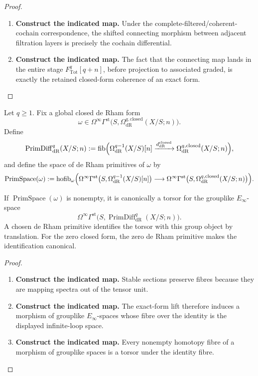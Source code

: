 \begin{proof}
\leavevmode
\begin{enumerate}[label=\textup{(\arabic*)}]
    \item \textbf{Construct the indicated map.}
    Under the complete-filtered/coherent-cochain correspondence, the shifted connecting
    morphism between adjacent filtration layers is precisely the cochain differential.
    \item \textbf{Construct the indicated map.}
    The fact that the connecting map lands in the entire stage
    \(F^q_{\mathrm{Tot}}[q+n]\), before projection to associated graded, is exactly the
    retained closed-form coherence of an exact form.
\end{enumerate}
\end{proof}

\begin{definition}
Let \(q\geq1\). Fix a global closed de Rham form
\[
  \omega\in
  \Omega^\infty
  \Gamma^{\mathrm{st}}
  \bigl(S,\Omega^{q,\mathrm{closed}}_{\mathrm{dR}}(X/S;n)\bigr).
\]
Define
\[
  \operatorname{PrimDiff}^q_{\mathrm{dR}}(X/S;n)
  :=
  \operatorname{fib}
  \Bigl(
  \Omega^{q-1}_{\mathrm{dR}}(X/S)[n]
  \xrightarrow{d^{\mathrm{closed}}_{\mathrm{dR}}}
  \Omega^{q,\mathrm{closed}}_{\mathrm{dR}}(X/S;n)
  \Bigr),
\]
and define the space of de Rham primitives of \(\omega\) by
\[
  \operatorname{PrimSpace}(\omega)
  :=
  \operatorname{hofib}_{\omega}
  \Bigl(
  \Omega^\infty\Gamma^{\mathrm{st}}
  \bigl(S,\Omega^{q-1}_{\mathrm{dR}}(X/S)[n]\bigr)
  \longrightarrow
  \Omega^\infty\Gamma^{\mathrm{st}}
  \bigl(S,\Omega^{q,\mathrm{closed}}_{\mathrm{dR}}(X/S;n)\bigr)
  \Bigr).
\]
\end{definition}

\begin{theorem}
\label{thm:primitive-torsor-expanded}
If \(\operatorname{PrimSpace}(\omega)\) is nonempty, it is canonically a torsor
for the grouplike \(E_\infty\)-space
\[
  \Omega^\infty
  \Gamma^{\mathrm{st}}
  \bigl(S,\operatorname{PrimDiff}^q_{\mathrm{dR}}(X/S;n)\bigr).
\]
A chosen de Rham primitive identifies the torsor with this group object by translation. For
the zero closed form, the zero de Rham primitive makes the identification canonical.
\end{theorem}

\begin{proof}
\leavevmode
\begin{enumerate}[label=\textup{(\arabic*)}]
    \item \textbf{Construct the indicated map.}
    Stable sections preserve fibres because they are mapping spectra out of the tensor
    unit.
    \item \textbf{Construct the indicated map.}
    The exact-form lift therefore induces a morphism of grouplike
    \(E_\infty\)-spaces whose fibre over the identity is the displayed infinite-loop
    space.
    \item \textbf{Construct the indicated map.}
    Every nonempty homotopy fibre of a morphism of grouplike spaces is a torsor
    under the identity fibre.
\end{enumerate}
\end{proof}

